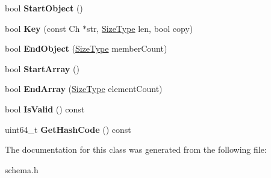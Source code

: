 \begin{DoxyCompactItemize}
\item 
bool {\bfseries Start\+Object} ()\hypertarget{a00139_a1607d6cac3daab9725e442e38d121028}{}\label{a00139_a1607d6cac3daab9725e442e38d121028}

\item 
bool {\bfseries Key} (const Ch $\ast$str, \hyperlink{a00677_a5ed6e6e67250fadbd041127e6386dcb5}{Size\+Type} len, bool copy)\hypertarget{a00139_a1b34d88f85f9c6a739c1f9038f14f078}{}\label{a00139_a1b34d88f85f9c6a739c1f9038f14f078}

\item 
bool {\bfseries End\+Object} (\hyperlink{a00677_a5ed6e6e67250fadbd041127e6386dcb5}{Size\+Type} member\+Count)\hypertarget{a00139_a7050f1552d88967944195163a6a0b08e}{}\label{a00139_a7050f1552d88967944195163a6a0b08e}

\item 
bool {\bfseries Start\+Array} ()\hypertarget{a00139_a2ceb3cc00216f6b6ce66907856a16404}{}\label{a00139_a2ceb3cc00216f6b6ce66907856a16404}

\item 
bool {\bfseries End\+Array} (\hyperlink{a00677_a5ed6e6e67250fadbd041127e6386dcb5}{Size\+Type} element\+Count)\hypertarget{a00139_ad445b2730be23e18b4dec2c4d1033419}{}\label{a00139_ad445b2730be23e18b4dec2c4d1033419}

\item 
bool {\bfseries Is\+Valid} () const \hypertarget{a00139_abd4cb8325b81217dc34eecf63d47579f}{}\label{a00139_abd4cb8325b81217dc34eecf63d47579f}

\item 
uint64\+\_\+t {\bfseries Get\+Hash\+Code} () const \hypertarget{a00139_ad44fcaf9a12fefb387e9624327572b61}{}\label{a00139_ad44fcaf9a12fefb387e9624327572b61}

\end{DoxyCompactItemize}


The documentation for this class was generated from the following file\+:\begin{DoxyCompactItemize}
\item 
schema.\+h\end{DoxyCompactItemize}
